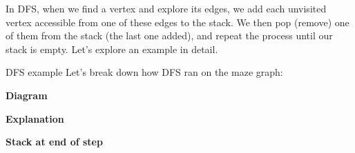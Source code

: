 \documentclass{article}
\begin{document}
In DFS, when we find a vertex and explore its edges, we add each unvisited vertex accessible from one of these edges to the stack. We then pop (remove) one of them from the stack (the last one added), and repeat the process until our stack is empty. Let's explore an example in detail.

\begin{example}{DFS example}
    Let's break down how DFS ran on the maze graph:

    \centering

    \begin{minipage}{0.4\linewidth}
        \centering
        \textbf{Diagram}
    \end{minipage}
    \begin{minipage}{0.4\linewidth}
    \centering
        \textbf{Explanation}
    \end{minipage}
    \begin{minipage}{0.15\linewidth}
    \centering
        \textbf{Stack at end of step}
    \end{minipage} \\
    

\end{example}
\end{document}

